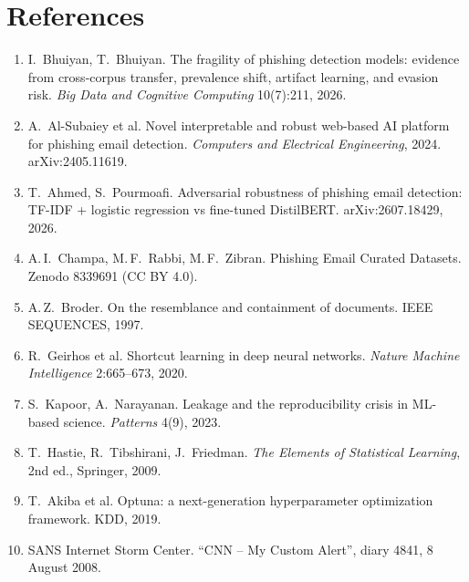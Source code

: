 \documentclass[11pt,a4paper]{article}
\begin{document}
\section*{References}
{\small
\begin{enumerate}
\item I.~Bhuiyan, T.~Bhuiyan. The fragility of phishing detection models: evidence from cross-corpus transfer, prevalence shift, artifact learning, and evasion risk. \emph{Big Data and Cognitive Computing} 10(7):211, 2026.
\item A.~Al-Subaiey et al. Novel interpretable and robust web-based AI platform for phishing email detection. \emph{Computers and Electrical Engineering}, 2024. arXiv:2405.11619.
\item T.~Ahmed, S.~Pourmoafi. Adversarial robustness of phishing email detection: TF-IDF + logistic regression vs fine-tuned DistilBERT. arXiv:2607.18429, 2026.
\item A.\,I.~Champa, M.\,F.~Rabbi, M.\,F.~Zibran. Phishing Email Curated Datasets. Zenodo 8339691 (CC BY 4.0).
\item A.\,Z.~Broder. On the resemblance and containment of documents. IEEE SEQUENCES, 1997.
\item R.~Geirhos et al. Shortcut learning in deep neural networks. \emph{Nature Machine Intelligence} 2:665--673, 2020.
\item S.~Kapoor, A.~Narayanan. Leakage and the reproducibility crisis in ML-based science. \emph{Patterns} 4(9), 2023.
\item T.~Hastie, R.~Tibshirani, J.~Friedman. \emph{The Elements of Statistical Learning}, 2nd ed., Springer, 2009.
\item T.~Akiba et al. Optuna: a next-generation hyperparameter optimization framework. KDD, 2019.
\item SANS Internet Storm Center. ``CNN -- My Custom Alert'', diary 4841, 8 August 2008.
\end{enumerate}
}
\end{document}
